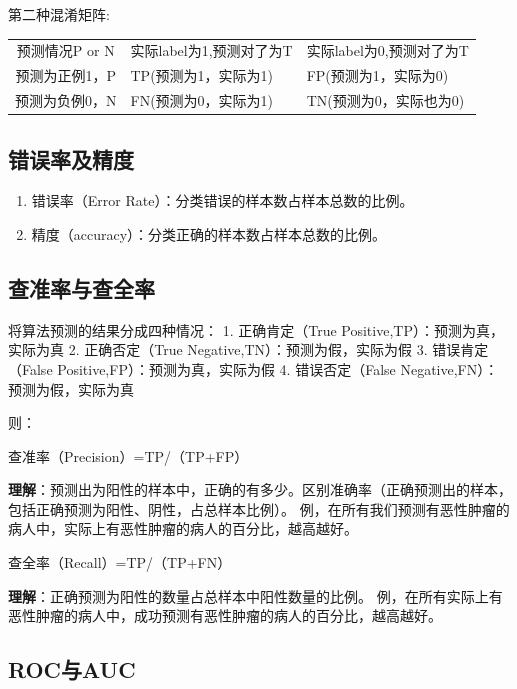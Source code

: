 第二种混淆矩阵:

\begin{longtable}[]{ cll }
预测情况P or N & 实际label为1,预测对了为T &
实际label为0,预测对了为T\tabularnewline
预测为正例1，P & TP(预测为1，实际为1) &
FP(预测为1，实际为0)\tabularnewline
预测为负例0，N & FN(预测为0，实际为1) &
TN(预测为0，实际也为0)\tabularnewline
\end{longtable}

\subsection{错误率及精度}\label{ux9519ux8befux7387ux53caux7cbeux5ea6}

\begin{enumerate}
\def\labelenumi{\arabic{enumi}.}
\item
  错误率（Error Rate）：分类错误的样本数占样本总数的比例。
\item
  精度（accuracy）：分类正确的样本数占样本总数的比例。
\end{enumerate}

\subsection{查准率与查全率}\label{ux67e5ux51c6ux7387ux4e0eux67e5ux5168ux7387}

将算法预测的结果分成四种情况： 1. 正确肯定（True
Positive,TP）：预测为真，实际为真 2. 正确否定（True
Negative,TN）：预测为假，实际为假 3. 错误肯定（False
Positive,FP）：预测为真，实际为假 4. 错误否定（False
Negative,FN）：预测为假，实际为真

则：

查准率（Precision）=TP/（TP+FP）

\textbf{理解}：预测出为阳性的样本中，正确的有多少。区别准确率（正确预测出的样本，包括正确预测为阳性、阴性，占总样本比例）。
例，在所有我们预测有恶性肿瘤的病人中，实际上有恶性肿瘤的病人的百分比，越高越好。

查全率（Recall）=TP/（TP+FN）

\textbf{理解}：正确预测为阳性的数量占总样本中阳性数量的比例。
例，在所有实际上有恶性肿瘤的病人中，成功预测有恶性肿瘤的病人的百分比，越高越好。

\subsection{ROC与AUC}\label{rocux4e0eauc}

